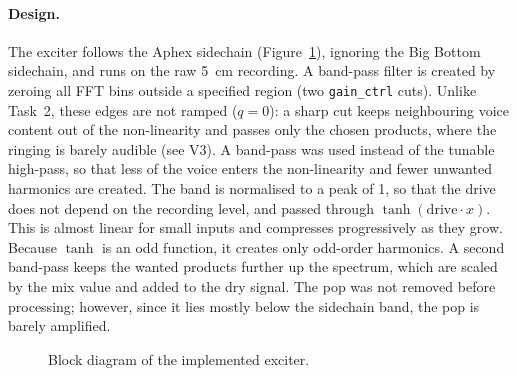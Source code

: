 \documentclass[11pt,a4paper]{article}
\begin{document}
\paragraph{Design.}
The exciter follows the Aphex sidechain (Figure~\ref{fig:block}), ignoring the Big Bottom sidechain, and runs on the raw \SI{5}{\centi\metre} recording.
A band-pass filter is created by zeroing all FFT bins outside a specified region (two \texttt{gain\_ctrl} cuts).
Unlike Task~2, these edges are not ramped ($q=0$): a sharp cut keeps neighbouring voice content out of the non-linearity and passes only the chosen products, where the ringing is barely audible (see V3).
A band-pass was used instead of the tunable high-pass, so that less of the voice enters the non-linearity and fewer unwanted harmonics are created.
The band is normalised to a peak of 1, so that the drive does not depend on the recording level, and passed through $\tanh(\mathrm{drive}\cdot x)$.
This is almost linear for small inputs and compresses progressively as they grow.
Because $\tanh$ is an odd function, it creates only odd-order harmonics.
A second band-pass keeps the wanted products further up the spectrum, which are scaled by the mix value and added to the dry signal.
The pop was not removed before processing; however, since it lies mostly below the sidechain band, the pop is barely amplified.

\begin{figure}[H]
  \centering
  \caption{Block diagram of the implemented exciter.}
  \label{fig:block}
\end{figure}
\end{document}
